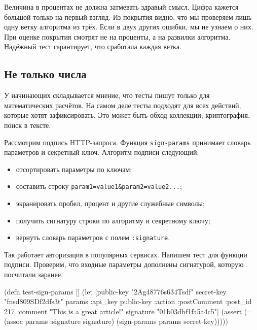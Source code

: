 Величина в процентах не должна затмевать здравый смысл. Цифра \covperc кажется
большой только на первый взгляд. Из покрытия видно, что мы проверяем лишь одну
ветку алгоритма из трёх. Если в двух других ошибки, мы не узнаем о них. При
оценке покрытия смотрят не на проценты, а на развилки алгоритма. Надёжный тест
гарантирует, что сработала каждая ветка.

\subsection{Не только числа}

У начинающих складывается мнение, что тесты пишут только для математических
расчётов. На самом деле тесты подходят для всех действий, которые хотят
зафиксировать. Это может быть обход коллекции, криптография, поиск в тексте.

Рассмотрим подпись HTTP-запроса. Функция \verb|sign-params| принимает словарь
параметров и секретный ключ. Алгоритм подписи следующий:

\begin{itemize}


\item
  отсортировать параметры по ключам;

\item
  составить строку \texttt{param1=value1\&param2\-=va\-lue2...};

\item
  экранировать пробел, процент и другие служебные символы;

\item
  получить сигнатуру строки по алгоритму  и секретному ключу;

\item
  вернуть словарь параметров с полем \texttt{:sig\-na\-tu\-re}.

\end{itemize}


Так работает авторизация в популярных сервисах. Напишем тест для функции
подписи. Проверим, что входные параметры дополнены сигнатурой, которую посчитали
заранее.

\ifafive\vspace{15mm}\pagebreak[4]\fi

\label{hmac-sha256}

\ifnarrow

\begin{english}
  \begin{clojure}
(defn test-sign-params []
  (let [public-key "2Ag48776s634Tsdf"
        secret-key "fnsd809SDf2dfs3t"
        params
        {:api_key public-key
         :action :postComment
         :post_id 217
         :comment
         "This is a great article!"}
        signature "01b03dbf1fa5a4c5"]
    (assert
      (= (assoc params
           :signature signature)
         (sign-params params
           secret-key)))))
  \end{clojure}
\end{english}

